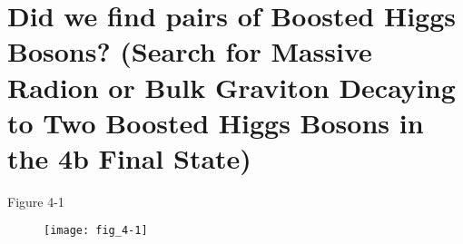 \chapter{Did we find pairs of Boosted Higgs Bosons? (Search for Massive Radion or Bulk Graviton Decaying to Two Boosted Higgs Bosons in the 4b Final State)}
\label{chap:four}

\sect{\lipsum*[30][1]}

\subsect{\lipsum*[30][2]}

\lipsum[1-5]

\subsect{\lipsum*[30][3]}

\lipsum[6-7]

\subsect{\lipsum*[30][4]}

\lipsum[9-10]

 Figure 4-1
\begin{figure}[tb]
   \centering
   \texttt{[image: fig\_4-1]}
   \caption[{\lipsum*[41][1]}]{\lipsum*[41][1-5]}
   \label{fig:fig_4-1}
\end{figure}

\sect{\lipsum*[31][1]}

\subsect{\lipsum*[31][2]}

\lipsum[11]

\subsect{\lipsum*[31][3]}

\lipsum[12-13]

\subsect{\lipsum*[31][4]}

\lipsum[14]

\subsect{\lipsum*[31][5]}

\lipsum[15]

\subsect{\lipsum*[31][6]}

\lipsum[16-17]

\subsect{\lipsum*[31][7]}

\lipsum[18]

\subsect{\lipsum*[31][8]}

\lipsum[20-21]

\subsect{\lipsum*[31][9]}

\lipsum[22]

\subsect{\lipsum*[31][10]}

\lipsum[25-26]

\subsect{\lipsum*[31][11]}

\lipsum[29-30]

\subsect{\lipsum*[31][12]}

\lipsum[31]

